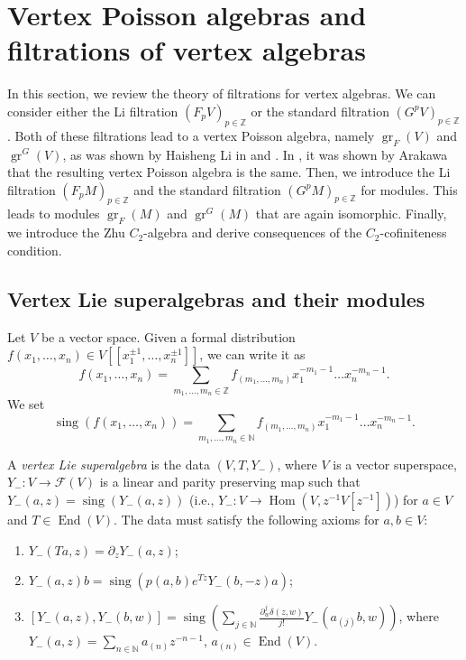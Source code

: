 \documentclass[a4paper, 12pt, reqno]{amsart}
\theoremstyle{remark}
\DeclareMathOperator{\gr}{gr}
\DeclareMathOperator{\End}{End}
\DeclareMathOperator{\Hom}{Hom}
\DeclareMathOperator{\sing}{sing}
\begin{document}
\section{Vertex Poisson algebras and filtrations of vertex algebras}
\label{sec:vert-poiss-algeb}

In this section, we review the theory of filtrations for vertex algebras.
We can consider either the Li filtration $(F_pV)_{p \in \mathbb{Z}}$ or the standard filtration $(G^pV)_{p \in \mathbb{Z}}$.
Both of these filtrations lead to a vertex Poisson algebra, namely $\gr_F(V)$ and $\gr^G(V)$, as was shown by Haisheng Li in \cite{li_abelianizing_2005} and \cite{li_vertex_2004}.
In \cite{arakawa_remark_2012}, it was shown by Arakawa that the resulting vertex Poisson algebra is the same.
Then, we introduce the Li filtration $(F_pM)_{p \in \mathbb{Z}}$ and the standard filtration $(G^pM)_{p \in \mathbb{Z}}$ for modules.
This leads to modules $\gr_F(M)$ and $\gr^G(M)$ that are again isomorphic.
Finally, we introduce the Zhu $C_2$-algebra and derive consequences of the $C_2$-cofiniteness condition.

\subsection{Vertex Lie superalgebras and their modules}
\label{sec:vert-lie-supera}

Let $V$ be a vector space.
Given a formal distribution $f(x_1, \dots, x_n) \in V[[x_1^{\pm1}, \dots, x_n^{\pm1}]]$, we can write it as
\begin{equation*}
  f(x_1, \dots, x_n) = \sum_{m_1, \dots, m_n \in \mathbb{Z}}f_{(m_1, \dots, m_n)}x_1^{-m_1 - 1}\dots x_n^{-m_n - 1}.
\end{equation*}
We set
\begin{equation*}
  \sing(f(x_1, \dots, x_n)) = \sum_{m_1, \dots, m_n \in \mathbb{N}}f_{(m_1, \dots, m_n)}x_1^{-m_1 - 1}\dots x_n^{-m_n - 1}.
\end{equation*}

A \emph{vertex Lie superalgebra} is the data $(V, T, Y_-)$, where $V$ is a vector superspace, $Y_-: V \to \mathcal{F}(V)$ is a linear and parity preserving map such that $Y_-(a, z) = \sing(Y_-(a, z))$ (i.e., $Y_-: V \to \Hom(V, z^{-1}V[z^{-1}])$) for $a \in V$ and $T \in \End(V)$.
The data must satisfy the following axioms for $a, b \in V$:
\begin{enumerate}
\item $Y_-(Ta, z) = \partial_zY_-(a, z)$;
\item $Y_-(a, z)b = \sing(p(a, b)e^{Tz}Y_-(b, -z)a)$;
\item $[Y_-(a, z), Y_-(b, w)] = \sing(\sum_{j \in \mathbb{N}}\frac{\partial^j_w\delta(z, w)}{j!}Y_-(a_{(j)}b, w))$, where $Y_-(a, z) = \sum_{n \in \mathbb{N}}a_{(n)}z^{-n - 1}$, $a_{(n)} \in \End(V)$.
\end{enumerate}
\end{document}
